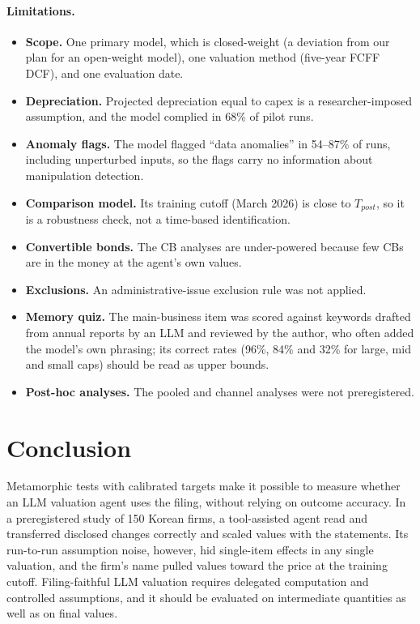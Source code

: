 \documentclass[11pt]{article}
\begin{document}
\paragraph{Limitations.}
\begin{itemize}
\item \textbf{Scope.} One primary model, which is closed-weight (a deviation from our plan for an open-weight model), one valuation method (five-year FCFF DCF), and one evaluation date.
\item \textbf{Depreciation.} Projected depreciation equal to capex is a researcher-imposed assumption, and the model complied in 68\% of pilot runs.
\item \textbf{Anomaly flags.} The model flagged ``data anomalies'' in 54--87\% of runs, including unperturbed inputs, so the flags carry no information about manipulation detection.
\item \textbf{Comparison model.} Its training cutoff (March 2026) is close to $T_{post}$, so it is a robustness check, not a time-based identification.
\item \textbf{Convertible bonds.} The CB analyses are under-powered because few CBs are in the money at the agent's own values.
\item \textbf{Exclusions.} An administrative-issue exclusion rule was not applied.
\item \textbf{Memory quiz.} The main-business item was scored against keywords drafted from annual reports by an LLM and reviewed by the author, who often added the model's own phrasing; its correct rates (96\%, 84\% and 32\% for large, mid and small caps) should be read as upper bounds.
\item \textbf{Post-hoc analyses.} The pooled and channel analyses were not preregistered.
\end{itemize}

\section{Conclusion}

Metamorphic tests with calibrated targets make it possible to measure whether an LLM valuation agent uses the filing, without relying on outcome accuracy. In a preregistered study of 150 Korean firms, a tool-assisted agent read and transferred disclosed changes correctly and scaled values with the statements. Its run-to-run assumption noise, however, hid single-item effects in any single valuation, and the firm's name pulled values toward the price at the training cutoff. Filing-faithful LLM valuation requires delegated computation and controlled assumptions, and it should be evaluated on intermediate quantities as well as on final values.
\end{document}
